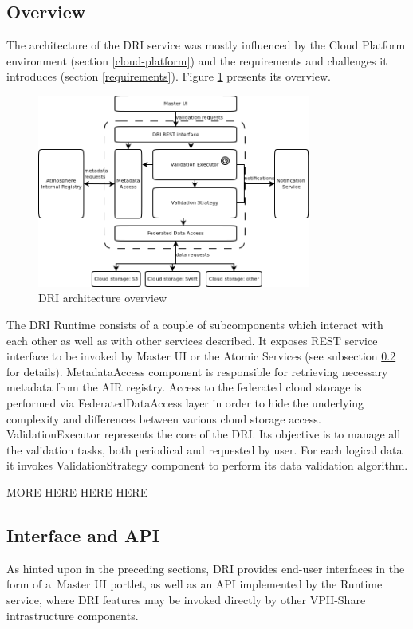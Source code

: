 		\subsection{Overview}
The architecture of the DRI service was mostly influenced by the Cloud Platform
environment (section \ref{cloud-platform}) and the requirements and challenges
it introduces (section \ref{requirements}). Figure \ref{fig:dri-architecture}
presents its overview.\\

\begin{figure}[h!]
	\centering
	\includegraphics[width=0.8\textwidth]{images/dri-architecture.png}
	\caption{DRI architecture overview}
	\label{fig:dri-architecture}
\end{figure}

The DRI Runtime consists of a couple of subcomponents which interact with each
other as well as with other services described. It exposes REST service
interface to be invoked by Master UI or the Atomic Services (see subsection
\ref{dri-interface} for details). MetadataAccess component is responsible for
retrieving necessary metadata from the AIR registry. Access to the federated
cloud storage is performed via FederatedDataAccess layer in order to hide
the underlying complexity and differences between various cloud storage access.
ValidationExecutor represents the core of the DRI. Its objective is to manage
all the validation tasks, both periodical and requested by user. For
each logical data it invokes ValidationStrategy component to perform
its data validation algorithm.

MORE HERE HERE HERE

		\subsection{Interface and API}
		\label{dri-interface}
As hinted upon in the preceding sections, DRI provides end-user interfaces
in the form of a~Master UI portlet, as well as an API implemented by the
Runtime service, where DRI features may be invoked directly by other VPH-Share
intrastructure components.\\

